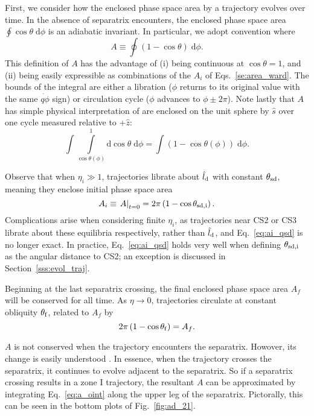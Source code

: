 \documentclass[
        fleqn,
        usenatbib,
        referee,
    ]{mnras}
\newcommand*{\at}[1]{\left.#1\right|}
\newcommand*{\p}[1]{\left(#1\right)}
\begin{document}
First, we consider how the enclosed phase space area by a trajectory evolves
over time. In the absence of separatrix encounters, the enclosed phase space
area $\oint \cos\theta \;\mathrm{d}\phi$ is an adiabatic invariant. In
particular, we adopt convention where
\begin{equation}
    A \equiv \oint \p{1 - \cos \theta}\;\mathrm{d}\phi.\label{eq:a_oint}
\end{equation}
This definition of $A$ has the advantage of (i) being continuous at $\cos \theta
= 1$, and (ii) being easily expressible as combinations of the $A_i$ of
Eqs.~\eqref{se:area_ward}. The bounds of the integral are either a libration
($\phi$ returns to its original value with the same $\dot{q\phi}$ sign) or
circulation cycle ($\phi$ advances to $\phi \pm 2\pi$). Note lastly that $A$ has
simple physical interpretation of are enclosed on the unit sphere by $\hat{s}$
over one cycle measured relative to $+\hat{z}$:
\begin{equation}
    \int \int\limits_{\cos \theta(\phi)}^1
        \mathrm{d}\cos\theta\;\mathrm{d}\phi = \int \p{1 - \cos \theta(\phi)}
            \;\mathrm{d}\phi.
\end{equation}

Observe that when $\eta_i \gg 1$, trajectories librate about $\hat{l}_{\rm d}$
with constant $\theta_{\rm sd}$, meaning they enclose initial phase space area
\begin{equation}
    A_i \equiv \at{A}_{t = 0}
        = 2\pi\p{1 - \cos \theta_{\rm sd, i}}.\label{eq:ai_qsd}
\end{equation}
Complications arise when considering finite $\eta_i$, as trajectories near CS2
or CS3 librate about these equilibria respectively, rather than $\hat{l}_{\rm
d}$, and Eq.~\eqref{eq:ai_qsd} is no longer exact. In practice,
Eq.~\eqref{eq:ai_qsd} holds very well when defining $\theta_{\rm sd, i}$ as the
angular distance to CS2; an exception is discussed in Section~\ref{sss:evol_traj}.

Beginning at the last separatrix crossing, the final enclosed phase space area
$A_f$ will be conserved for all time. As $\eta \to 0$, trajectories circulate at
constant obliquity $\theta_{\rm f}$, related to $A_f$ by
\begin{equation}
    2\pi\p{1 - \cos \theta_{\rm f}} = A_f. \label{eq:qfaf}
\end{equation}

$A$ is not conserved when the trajectory encounters the separatrix. Howover, its
change is easily understood \citep{henrard1982}. In essence, when the trajectory
crosses the separatrix, it continues to evolve adjacent to the separatrix. So if
a separatrix crossing results in a zone I trajectory, the resultant $A$ can be
approximated by integrating Eq.~\eqref{eq:a_oint} along the upper leg of the
separatrix. Pictorally, this can be seen in the bottom plots of
Fig.~\ref{fig:ad_21}.
\end{document}
